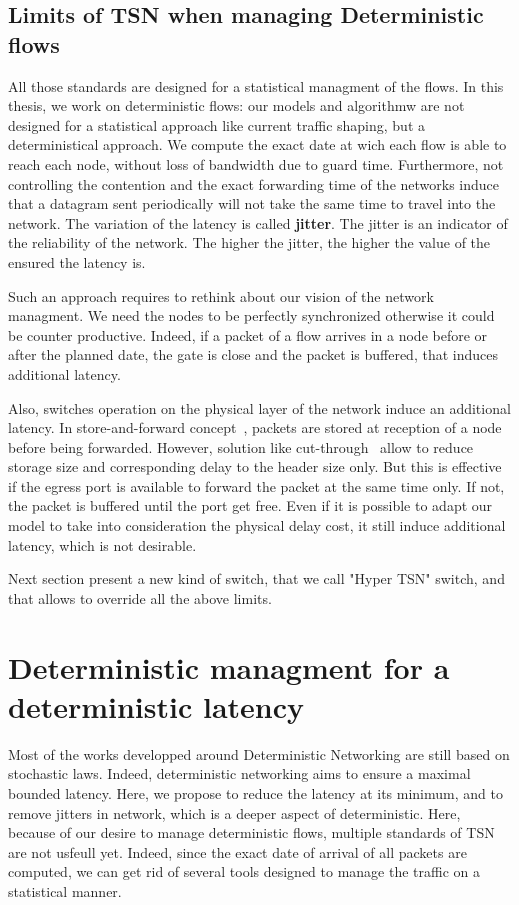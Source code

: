 \subsection{Limits of TSN when managing Deterministic flows}

All those standards are designed for a statistical managment of the flows. In this thesis, we work on deterministic flows: our models and algorithmw are not designed for a statistical approach like current traffic shaping, but a deterministical approach. We compute the exact date at wich each flow is able to reach each node, without loss of bandwidth due to guard time. Furthermore, not controlling the contention and the exact forwarding time of the networks induce that a datagram sent periodically will not take the same time to travel into the network. The variation of the latency is called \textbf{jitter}. The jitter is an indicator of the reliability of the network. The higher the jitter, the higher the value of the ensured the latency is.

Such an approach requires to rethink about our vision of the network managment. We need the nodes to be perfectly synchronized otherwise it could be counter productive. Indeed, if a packet of a flow arrives in a node before or after the planned date, the gate is close and the packet is buffered, that induces additional latency.

Also, switches operation on the physical layer of the network induce an additional latency. In store-and-forward concept~\cite{tindell1992store}, packets are stored at reception of a node before being forwarded. However, solution like cut-through~\cite{kermani1979virtual} allow to reduce storage size and corresponding delay to the header size only. But this is effective if the egress port is available to forward the packet at the same time only. If not, the packet is buffered until the port get free. Even if it is possible to adapt our model to take into consideration the physical delay cost, it still induce additional latency, which is not desirable.

Next section present a new kind of switch, that we call "Hyper TSN" switch, and that allows to override all the above limits.

\section{Deterministic managment for a deterministic latency}
\label{sec:platform}


Most of the works developped around Deterministic Networking are still based on stochastic laws. Indeed, deterministic networking aims to ensure a maximal bounded latency. Here, we propose to reduce the latency at its minimum, and to remove jitters in network, which is a deeper aspect of deterministic.
Here, because of our desire to manage deterministic flows, multiple standards of TSN are not usfeull yet. Indeed, since the exact date of arrival of all packets are computed, we can get rid of several tools designed to manage the traffic on a statistical manner. 

